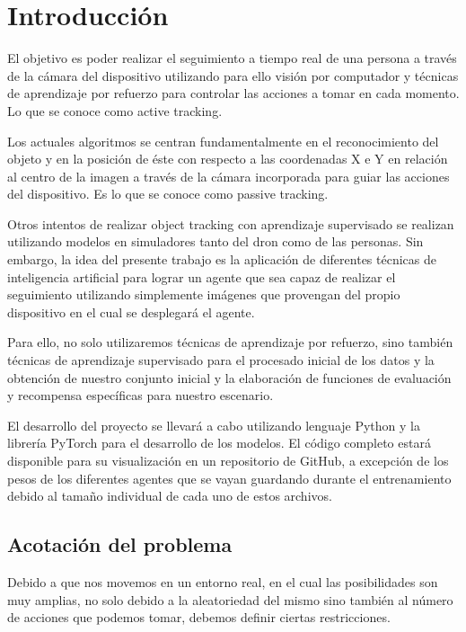 
\cleardoublepage

\chapter{Introducción}
\label{introduccion}

El objetivo es poder realizar el seguimiento a tiempo real de una persona a través de la cámara del dispositivo utilizando para ello visión por computador y técnicas de aprendizaje por refuerzo para controlar las acciones a tomar en cada momento. Lo que se conoce como active tracking. 

Los actuales algoritmos se centran fundamentalmente en el reconocimiento del objeto y en la posición de éste con respecto a las coordenadas X e Y en relación al centro de la imagen a través de la cámara incorporada para guiar las acciones del dispositivo. Es lo que se conoce como passive tracking.

Otros intentos de realizar object tracking con aprendizaje supervisado se realizan utilizando modelos en simuladores tanto del dron como de las personas. Sin embargo, la idea del presente trabajo es la aplicación de diferentes técnicas de inteligencia artificial para lograr un agente que sea capaz de realizar el seguimiento utilizando simplemente imágenes que provengan del propio dispositivo en el cual se desplegará el agente.

Para ello, no solo utilizaremos técnicas de aprendizaje por refuerzo, sino también técnicas de aprendizaje supervisado para el procesado inicial de los datos y la obtención de nuestro conjunto inicial y la elaboración de funciones de evaluación y recompensa específicas para nuestro escenario.

El desarrollo del proyecto se llevará a cabo utilizando lenguaje Python y la librería PyTorch para el desarrollo de los modelos. El código completo estará disponible para su visualización en un repositorio de GitHub, a excepción de los pesos de los diferentes agentes que se vayan guardando durante el entrenamiento debido al tamaño individual de cada uno de estos archivos.


\section{Acotación del problema}
\label{acotacion-del-problema}

Debido a que nos movemos en un entorno real, en el cual las posibilidades son muy amplias, no solo debido a la aleatoriedad del mismo sino también al número de acciones que podemos tomar, debemos definir ciertas restricciones.

